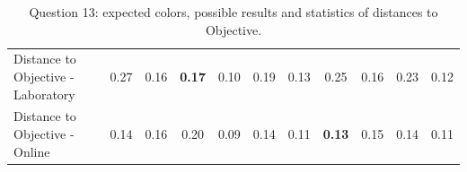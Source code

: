 \begin{table}[H]
{\begin{tabular}{lccccccccccccc}
    \multicolumn{4}{l}{Distance to Objective - Laboratory}                                                                                           & \multicolumn{1}{|c}{0.27}       & \multicolumn{1}{c|}{0.16}    & \multicolumn{1}{|c}{\textbf{0.17}}       & \multicolumn{1}{c|}{0.10}    & \multicolumn{1}{|c}{0.19}       & \multicolumn{1}{c|}{0.13}    & \multicolumn{1}{|c}{0.25}       & \multicolumn{1}{c|}{0.16}    & \multicolumn{1}{|c}{0.23}       & \multicolumn{1}{c|}{0.12}    \\
    \multicolumn{4}{l}{Distance to Objective - Online}                                                                                               & \multicolumn{1}{|c}{0.14}        & \multicolumn{1}{c|}{0.16}    & \multicolumn{1}{|c}{0.20}        & \multicolumn{1}{c|}{0.09}    & \multicolumn{1}{|c}{0.14}       & \multicolumn{1}{c|}{0.11}    & \multicolumn{1}{|c}{\textbf{0.13}}        & \multicolumn{1}{c|}{0.15}    & \multicolumn{1}{|c}{0.14}       & \multicolumn{1}{c|}{0.11}    \\ \hline
    \end{tabular}}
  \caption[Question 13, with expected Results.]{Question 13: expected colors, possible results and statistics of distances to Objective.}
  \label{table:lab_q13_expected}
\end{table}
%
